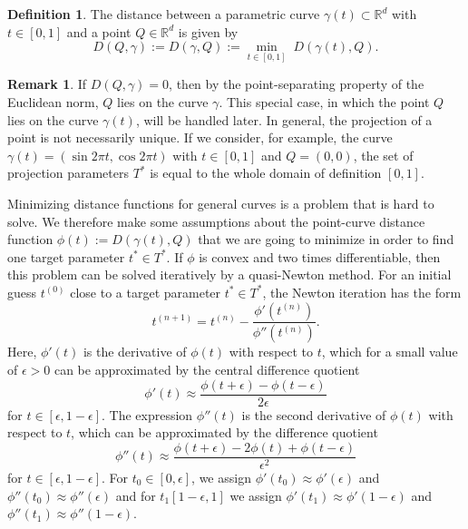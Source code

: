 \documentclass[a4paper, 11pt]{report}
\theoremstyle{definition}
\newtheorem{definition}{Definition}[section]
\newtheorem*{remark}{Remark}
\begin{document}
	\begin{definition}
		The distance between a parametric curve $\gamma(t) \subset \mathbb{R}^d$ with $t \in [0,1]$ and a point $Q \in \mathbb{R}^d$ is given by
			$$D(Q, \gamma) := D(\gamma, Q) := \underset{t \in [0,1]}{\min} \; D(\gamma(t), Q).$$
	\end{definition}

	\begin{remark}
		If $D(Q, \gamma) = 0$, then by the point-separating property of the Euclidean norm, $Q$ lies on the curve $\gamma$. This special case, in which the point $Q$ lies on the curve $\gamma(t)$, will be handled later. In general, the projection of a point is not necessarily unique. If we consider, for example, the curve $\gamma(t) = (\sin 2\pi t, \cos 2\pi t)$ with $t \in [0,1]$ and $Q = (0,0)$, the set of projection parameters $T^*$ is equal to the whole domain of definition $[0,1]$.
	\end{remark}

	Minimizing distance functions for general curves is a problem that is hard to solve. We therefore make some assumptions about the point-curve distance function $\phi(t) := D(\gamma(t), Q)$ that we are going to minimize in order to find one target parameter $t^* \in T^*$. If $\phi$ is convex and two times differentiable, then this problem can be solved iteratively by a quasi-Newton method. For an initial guess $t^{(0)}$ close to a target parameter $t^* \in T^*$, the Newton iteration has the form
		$$ t^{(n+1)} = t^{(n)} - \frac {\phi'(t^{(n)})}{\phi''(t^{(n)})}. $$
	Here, $\phi'(t)$ is the derivative of $\phi(t)$ with respect to $t$, which for a small value of $\epsilon > 0$ can be approximated by the central difference quotient
		\begin{equation}
			\phi'(t) \approx \frac{\phi(t+\epsilon) - \phi(t-\epsilon)}{2\epsilon}
		\end{equation}
	for $t \in [\epsilon, 1-\epsilon]$. The expression $\phi''(t)$ is the second derivative of $\phi(t)$ with respect to $t$, which can be approximated by the difference quotient
		\begin{equation}
			\phi''(t) \approx \frac{\phi(t+\epsilon) - 2\phi(t) + \phi(t-\epsilon)}{\epsilon^2}
		\end{equation}
	for $t \in [\epsilon, 1-\epsilon]$. For $t_0 \in [0,\epsilon]$, we assign $\phi'(t_0) \approx \phi'(\epsilon)$ and $\phi''(t_0) \approx \phi''(\epsilon)$ and for $t_1 [1-\epsilon,1]$ we assign $\phi'(t_1) \approx \phi'(1-\epsilon)$ and $\phi''(t_1) \approx \phi''(1-\epsilon)$.
\end{document}
